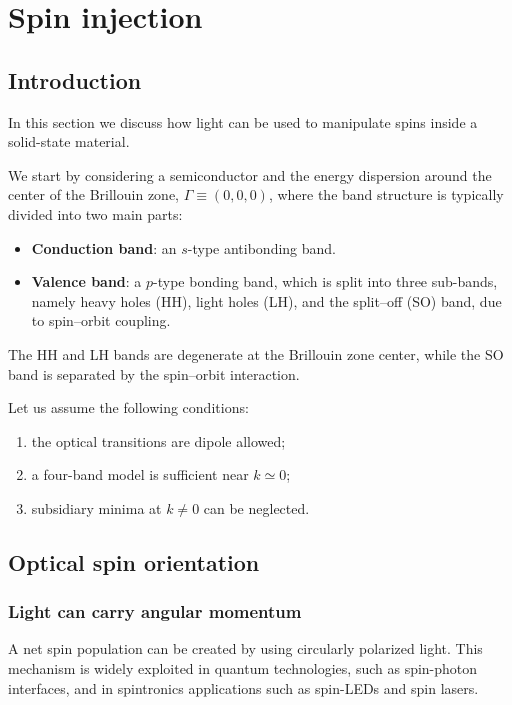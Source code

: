 \section{Spin injection}\label{sec:spin-injection}

\subsection{Introduction}

In this section we discuss how light can be used to manipulate spins inside a solid-state material.

We start by considering a semiconductor and the energy dispersion around the center of the Brillouin zone, $\Gamma \equiv (0,0,0)$, where the band structure is typically divided into two main parts:
\begin{itemize}
    \item \textbf{Conduction band}: an $s$-type antibonding band.
    \item \textbf{Valence band}: a $p$-type bonding band, which is split into three sub-bands, namely heavy holes (HH), light holes (LH), and the split--off (SO) band, due to spin--orbit coupling.
\end{itemize}
The HH and LH bands are degenerate at the Brillouin zone center, while the SO band is separated by the spin--orbit interaction.

Let us assume the following conditions:
\begin{enumerate}
    \item the optical transitions are dipole allowed;
    \item a four-band model is sufficient near $k \simeq 0$;
    \item subsidiary minima at $k \neq 0$ can be neglected.
\end{enumerate}


\subsection{Optical spin orientation}

\subsubsection{Light can carry angular momentum}
A net spin population can be created by using circularly polarized light. This mechanism is widely exploited in quantum technologies, such as spin-photon interfaces, and in spintronics applications such as spin-LEDs and spin lasers.

